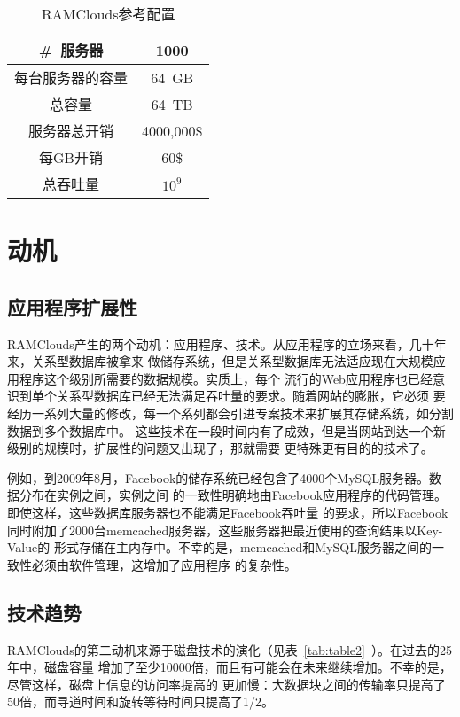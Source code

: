 \documentclass[translation]{zjutreport}
\begin{document}
\begin{table}[htbp]
\caption{RAMClouds参考配置}\label{tab:table1}
\vspace{0.5em}
\begin{center}
{\wuhao
\begin{tabular}{cc}
\toprule[1.5pt]
\#~服务器 & 1000\\
\midrule[1pt]
每台服务器的容量 & 64~GB \\
总容量 & 64~TB \\
服务器总开销 & 4000,000\$ \\
每GB开销 & 60\$ \\
总吞吐量 & $10^{9}$ \\
\bottomrule[1.5pt]
\end{tabular}}
\end{center}
\vspace{\baselineskip}
\end{table}

\chapter{动机}
\section{应用程序扩展性}
RAMClouds产生的两个动机：应用程序、技术。从应用程序的立场来看，几十年来，关系型数据库被拿来
做储存系统，但是关系型数据库无法适应现在大规模应用程序这个级别所需要的数据规模。实质上，每个
流行的Web应用程序也已经意识到单个关系型数据库已经无法满足吞吐量的要求。随着网站的膨胀，它必须
要经历一系列大量的修改，每一个系列都会引进专案技术来扩展其存储系统，如分割数据到多个数据库中。
这些技术在一段时间内有了成效，但是当网站到达一个新级别的规模时，扩展性的问题又出现了，那就需要
更特殊更有目的的技术了。

例如，到2009年8月，Facebook的储存系统已经包含了4000个MySQL服务器。数据分布在实例之间，实例之间
的一致性明确地由Facebook应用程序的代码管理。即使这样，这些数据库服务器也不能满足Facebook吞吐量
的要求，所以Facebook同时附加了2000台memcached服务器，这些服务器把最近使用的查询结果以Key-Value的
形式存储在主内存中。不幸的是，memcached和MySQL服务器之间的一致性必须由软件管理，这增加了应用程序
的复杂性。

\section{技术趋势}
RAMClouds的第二动机来源于磁盘技术的演化（见表~\ref{tab:table2}~）。在过去的25年中，磁盘容量
增加了至少10000倍，而且有可能会在未来继续增加。不幸的是，尽管这样，磁盘上信息的访问率提高的
更加慢：大数据块之间的传输率只提高了50倍，而寻道时间和旋转等待时间只提高了1/2。
\end{document}
